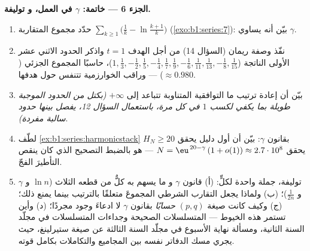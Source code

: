 \begin{problem}[{مسألة نهاية الأسبوع --- $H_n = \ln n + \gamma +
\frac{1}{2n} + O(n^{-2})$، وإعادة ترتيب $1 - \frac12 +
\frac13 - \dots$ إلى $\frac{\ln 2}{2}$}]
\medskip
\noindent\textbf{الجزء 6 --- خاتمة: $\gamma$ في العمل، و
توليفة.}
\begin{enumerate}[resume]
  \item حدّد مجموع  المتقاربة
        $\sum_{k\geq1} \bigl(\frac1k - \ln\frac{k+1}{k}\bigr)$
        (\cref{exo:b1:series:7}): بيّن أنه يساوي $\gamma$.
  \item نفّذ وصفة ريمان (السؤال 14) من أجل الهدف $t =
        1$ واذكر الحدود الاثني عشر الأولى الناتجة ($1, \frac13,
        -\frac12, \frac15, -\frac14, \frac17, \frac19, -\frac16,
        \frac1{11}, \frac1{13}, -\frac18, \frac1{15}$)،
        حاسبًا المجموع الجزئي ($\approx 0.980$) --- وراقب
        الخوارزمية تتنفس حول هدفها.
  \item بيّن أن إعادة ترتيب ما  التوافقية المتناوبة
        تتباعد إلى $+\infty$ \emph{(بكتل من الحدود
        الموجبة طويلة بما يكفي لكسب $1$ في كل مرة، باستعمال السؤال
        12، يفصل بينها حدود سالبة مفردة)}.
  \item لطّف \cref{ex:b1:series:harmonicstack} بقانون
        $\gamma$: بيّن أن أول دليل يحقق $H_N \geq
        20$ يحقق $N = \eu^{\,20 - \gamma}\,(1 + o(1))
        \approx 2.7\cdot10^{8}$ ---  هو بالضبط
        التصحيح الذي كان ينقص التأطيرَ الفجّ.
  \item توليفة، جملة واحدة لكلٍّ: (أ) قانون $\gamma$ و
        ما يسهم به كلٌّ من قطعه الثلاث ($\ln n$ و $\gamma$ و
        $\frac{1}{2n}$)؛ (ب) ولماذا يجعل التقارب الشرطي
        المجموعَ متعلقًا بالترتيب بينما يمنع  ذلك؛ (ج) وكيف كانت صيغة $(p,q)$
        \emph{حسابًا} بقانون $\gamma$ لا ادعاءَ
        وجود مجردًا؛ (د) وأين تستمر هذه
        الخيوط --- المتسلسلات الصحيحة وجداءات المتسلسلات
        في مجلّد السنة الثانية، ومسألة نهاية الأسبوع في مجلّد السنة الثالثة
        عن صيغة ستيرلينغ، حيث يجري مسك الدفاتر نفسه
        بين المجاميع والتكاملات بكامل قوته.
\end{enumerate}
\end{problem}

